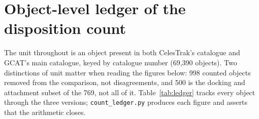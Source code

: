 \appendix

\section{Object-level ledger of the disposition count}
\label{app:ledger}

The unit throughout is an object present in both CelesTrak's catalogue and GCAT's
main catalogue, keyed by catalogue number (69,390 objects). Two
distinctions of unit matter when reading the figures below: 998 counted objects
removed from the comparison, not disagreements, and 500 is the docking and
attachment subset of the 769, not all of it. Table~\ref{tab:ledger} tracks every
object through the three versions; \texttt{count\_ledger.py} produces each
figure and asserts that the arithmetic closes.

